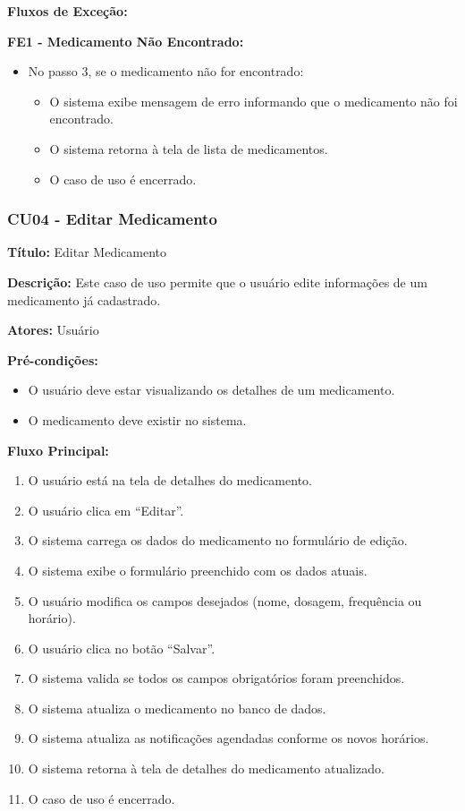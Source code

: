 \documentclass[12pt]{article}
\begin{document}
\textbf{Fluxos de Exceção:}

\textbf{FE1 - Medicamento Não Encontrado:}
\begin{itemize}
    \item No passo 3, se o medicamento não for encontrado:
    \begin{itemize}
        \item O sistema exibe mensagem de erro informando que o medicamento não foi encontrado.
        \item O sistema retorna à tela de lista de medicamentos.
        \item O caso de uso é encerrado.
    \end{itemize}
\end{itemize}

\subsubsection{CU04 - Editar Medicamento}

\textbf{Título:} Editar Medicamento

\textbf{Descrição:} Este caso de uso permite que o usuário edite informações de um medicamento já cadastrado.

\textbf{Atores:} Usuário

\textbf{Pré-condições:}
\begin{itemize}
    \item O usuário deve estar visualizando os detalhes de um medicamento.
    \item O medicamento deve existir no sistema.
\end{itemize}

\textbf{Fluxo Principal:}
\begin{enumerate}
    \item O usuário está na tela de detalhes do medicamento.
    \item O usuário clica em ``Editar''.
    \item O sistema carrega os dados do medicamento no formulário de edição.
    \item O sistema exibe o formulário preenchido com os dados atuais.
    \item O usuário modifica os campos desejados (nome, dosagem, frequência ou horário).
    \item O usuário clica no botão ``Salvar''.
    \item O sistema valida se todos os campos obrigatórios foram preenchidos.
    \item O sistema atualiza o medicamento no banco de dados.
    \item O sistema atualiza as notificações agendadas conforme os novos horários.
    \item O sistema retorna à tela de detalhes do medicamento atualizado.
    \item O caso de uso é encerrado.
\end{enumerate}
\end{document}
